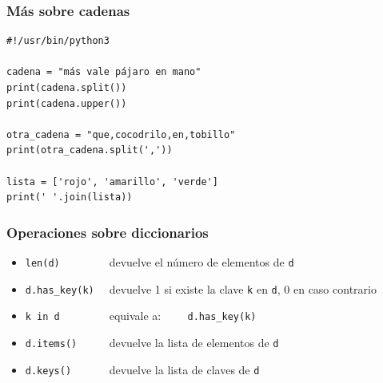 \documentclass{beamer}
\begin{document}
\begin{frame}[fragile]

\frametitle{Más sobre cadenas}  

  \begin{footnotesize}
\begin{verbatim}
#!/usr/bin/python3

cadena = "más vale pájaro en mano"
print(cadena.split())
print(cadena.upper())

otra_cadena = "que,cocodrilo,en,tobillo"
print(otra_cadena.split(','))

lista = ['rojo', 'amarillo', 'verde']
print(' '.join(lista))

\end{verbatim}
  \end{footnotesize}



  
\end{frame}

\begin{frame}[fragile]
\frametitle{Operaciones sobre diccionarios}

\begin{footnotesize}
  \begin{itemize}
  \item \verb|len(d)        | devuelve el número de elementos de \verb|d|
  \item \verb|d.has_key(k)  | devuelve 1 si existe la clave \verb|k| en
    \verb|d|, 0 en caso contrario
  \item \verb|k in d        | equivale a: \verb|    d.has_key(k)|
  \item \verb|d.items()     | devuelve la lista de elementos de \verb|d|
  \item \verb|d.keys()      | devuelve la lista de claves de \verb|d|
  \end{itemize}
\end{footnotesize}
\end{frame}





\end{document}
